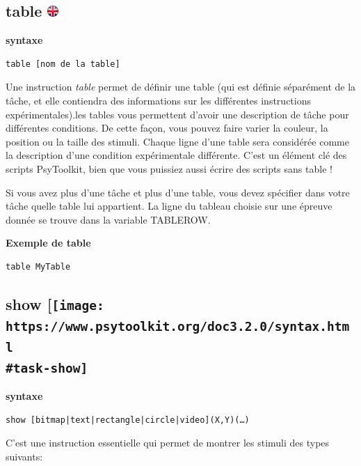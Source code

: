 \documentclass[
]{book}
\begin{document}
\hypertarget{table}{%
\subsection[table ]{\texorpdfstring{table
\href{https://www.psytoolkit.org/doc3.2.0/syntax.html\#table}{\protect\includegraphics{img/ukflag.png}}}{table }}\label{table}}

\textbf{syntaxe}

\begin{verbatim}
table [nom de la table]
\end{verbatim}

Une instruction \emph{table} permet de définir une table (qui est
définie séparément de la tâche, et elle contiendra des informations sur
les différentes instructions expérimentales).les tables vous permettent
d'avoir une description de tâche pour différentes conditions. De cette
façon, vous pouvez faire varier la couleur, la position ou la taille des
stimuli. Chaque ligne d'une table sera considérée comme la description
d'une condition expérimentale différente. C'est un élément clé des
scripts PsyToolkit, bien que vous puissiez aussi écrire des scripts sans
table !

Si vous avez plus d'une tâche et plus d'une table, vous devez spécifier
dans votre tâche quelle table lui appartient. La ligne du tableau
choisie sur une épreuve donnée se trouve dans la variable TABLEROW.

\textbf{Exemple de table}

\begin{verbatim}
table MyTable
\end{verbatim}

\hypertarget{show-imgukflag.png}{%
\subsection[show {[}]{\texorpdfstring{show
{[}\protect\texttt{[image: https://www.psytoolkit.org/doc3.2.0/syntax.html\\\#task-show]}}{show {[}\}(img/ukflag.png)}}\label{show-imgukflag.png}}

\textbf{syntaxe}

\begin{verbatim}
show [bitmap|text|rectangle|circle|video](X,Y)(…)
\end{verbatim}

C'est une instruction essentielle qui permet de montrer les stimuli des
types suivants:
\end{document}
